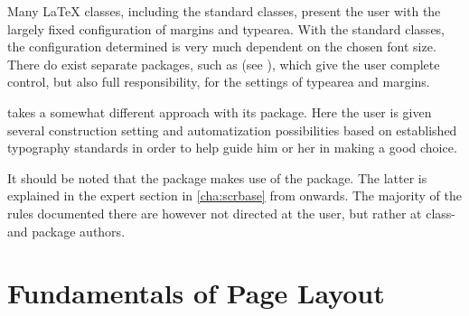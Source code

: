Many {\LaTeX} classes, including the standard classes, present the user
with the largely fixed configuration of margins and typearea. With the
standard classes, the configuration determined is very much dependent
on the chosen font size. There do exist separate packages, such as
 (see
\cite{package:geometry}), which give the user complete control, but
also full responsibility, for the settings of typearea and margins.

\KOMAScript{} takes a somewhat different approach with its
 package. Here the user is given several
construction setting and automatization possibilities based on
established typography standards in order to help guide him or her in
making a good choice.

It should be noted that the  package makes use of
the  package. The latter is explained in the expert
section  in
\autoref{cha:scrbase} from  onwards. The
majority of the rules documented there are however not directed at the
user, but rather at class- and package authors.

\section{Fundamentals of Page Layout}
\label{sec:typearea.basics}

